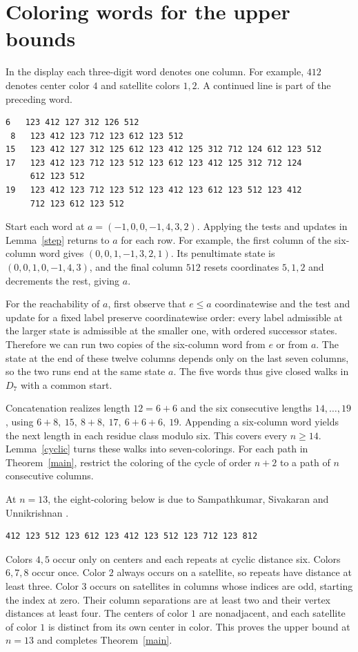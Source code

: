 \documentclass[11pt]{article}
\begin{document}
\section{Coloring words for the upper bounds}
\label{sec:words}
In the display each three-digit word denotes one column.
For example, \(412\) denotes center color \(4\) and satellite colors \(1,2\).
A continued line is part of the preceding word.
\begin{Verbatim}[fontsize=\small]
 6   123 412 127 312 126 512
 8   123 412 123 712 123 612 123 512
15   123 412 127 312 125 612 123 412 125 312 712 124 612 123 512
17   123 412 123 712 123 512 123 612 123 412 125 312 712 124
     612 123 512
19   123 412 123 712 123 512 123 412 123 612 123 512 123 412
     712 123 612 123 512
\end{Verbatim}

Start each word at \(a=(-1,0,0,-1,4,3,2)\).
Applying the tests and updates in Lemma~\ref{step} returns to \(a\) for
each row. For example, the first column of the six-column word gives
\((0,0,1,-1,3,2,1)\). Its penultimate state is
\((0,0,1,0,-1,4,3)\), and the final column \(512\) resets coordinates
\(5,1,2\) and decrements the rest, giving \(a\).

For the reachability of \(a\), first observe that \(e\le a\) coordinatewise
and the test and update for a fixed label preserve coordinatewise order:
every label admissible at the larger state is admissible at the smaller
one, with ordered successor states. Therefore we can run two copies of
the six-column word from \(e\) or from \(a\). The state at the end of these
twelve columns depends only on the last seven columns, so the two runs end
at the same state \(a\). The five words thus give closed walks in \(D_7\)
with a common start.

Concatenation realizes length \(12=6+6\) and the six consecutive lengths
\(14,\ldots,19\), using \(6+8,\ 15,\ 8+8,\ 17,\ 6+6+6,\ 19\).
Appending a six-column word yields the next length in each residue
class modulo six. This covers every \(n\ge14\). Lemma~\ref{cyclic}
turns these walks into seven-colorings. For each path in
Theorem~\ref{main}, restrict the coloring of the cycle of order \(n+2\)
to a path of \(n\) consecutive columns.

At \(n=13\), the eight-coloring below is due to
Sampathkumar, Sivakaran and Unnikrishnan \cite[p.~107]{ssu}.
\begin{Verbatim}[fontsize=\small]
     412 123 512 123 612 123 412 123 512 123 712 123 812
\end{Verbatim}
Colors \(4,5\) occur only on centers and each repeats at cyclic distance
six. Colors \(6,7,8\) occur once. Color \(2\) always occurs on a satellite,
so repeats have distance at least three. Color \(3\) occurs on
satellites in columns whose indices are odd, starting the index at zero.
Their column separations are at least two and their vertex distances at
least four. The centers of color \(1\) are nonadjacent, and each satellite
of color \(1\) is distinct from its own center in color.
This proves the upper bound at \(n=13\) and completes
Theorem~\ref{main}.
\end{document}
